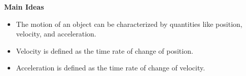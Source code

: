 \documentclass[]{article}
\begin{document}
\begin{PresentSpace}

\end{PresentSpace}
\newpage
\begin{TeacherMargin}

\end{TeacherMargin}
\begin{PresentSpace}

\end{PresentSpace}
\newpage
\begin{TeacherMargin}

\end{TeacherMargin}
\begin{PresentSpace}

\end{PresentSpace}
\newpage
\begin{TeacherMargin}

\end{TeacherMargin}
\begin{PresentSpace}
\textbf{Main Ideas}
\begin{itemize}
	\item The motion of an object can be characterized by quantities like position, velocity, and acceleration.
	\item Velocity is defined as the time rate of change of position.
	\item Acceleration is defined as the time rate of change of velocity.
\end{itemize}
\end{PresentSpace}
\end{document}
